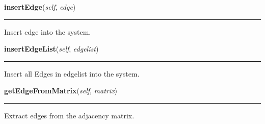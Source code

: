     \label{Epigrass:dgraph:Graph:insertEdge}

    \vspace{0.5ex}

    \begin{boxedminipage}{\textwidth}

    \raggedright \textbf{insertEdge}(\textit{self}, \textit{edge})

    \vspace{-1.5ex}

    \rule{\textwidth}{0.5\fboxrule}
    Insert edge into the system.

    \vspace{1ex}

    \end{boxedminipage}

    \label{Epigrass:dgraph:Graph:insertEdgeList}

    \vspace{0.5ex}

    \begin{boxedminipage}{\textwidth}

    \raggedright \textbf{insertEdgeList}(\textit{self}, \textit{edgelist})

    \vspace{-1.5ex}

    \rule{\textwidth}{0.5\fboxrule}
    Insert all Edges in edgelist into the system.

    \vspace{1ex}

    \end{boxedminipage}

    \label{Epigrass:dgraph:Graph:getEdgeFromMatrix}

    \vspace{0.5ex}

    \begin{boxedminipage}{\textwidth}

    \raggedright \textbf{getEdgeFromMatrix}(\textit{self}, \textit{matrix})

    \vspace{-1.5ex}

    \rule{\textwidth}{0.5\fboxrule}
    Extract edges from the adjacency matrix.

    \vspace{1ex}

    \end{boxedminipage}

